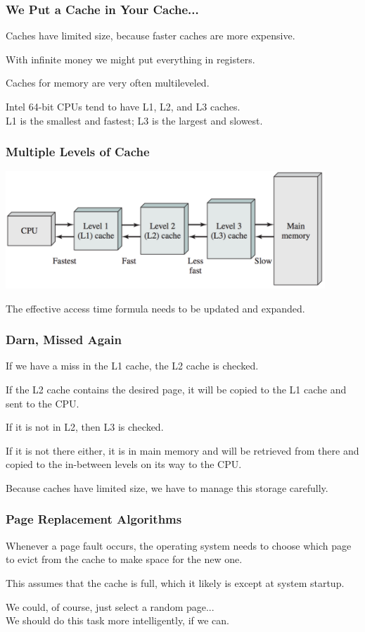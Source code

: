\begin{frame}
\frametitle{We Put a Cache in Your Cache...}

Caches have limited size, because faster caches are more expensive. 

With infinite money we might put everything in registers.

Caches for memory are very often multileveled. 

Intel 64-bit CPUs tend to have L1, L2, and L3 caches.\\
\quad L1 is the smallest and fastest;  L3 is the largest and slowest.

\end{frame}

\begin{frame}
\frametitle{Multiple Levels of Cache}

\begin{center}
\includegraphics[width=0.9\textwidth]{images/caches.png}
\end{center}

The effective access time formula needs to be updated and expanded.

\end{frame}

\begin{frame}
\frametitle{Darn, Missed Again}

If we have a miss in the L1 cache, the L2 cache is checked. 

If the L2 cache contains the desired page, it will be copied to the L1 cache and sent to the CPU. 

If it is not in L2, then L3 is checked. 

If it is not there either, it is in main memory and will be retrieved from there and copied to the in-between levels on its way to the CPU. 

Because caches have limited size, we have to manage this storage carefully.


\end{frame}

\begin{frame}
\frametitle{Page Replacement Algorithms}

Whenever a page fault occurs, the operating system needs to choose which page to \alert{evict} from the cache to make space for the new one. 

This assumes that the cache is full, which it likely is except at system startup. 

We could, of course, just select a random page...\\
\quad We should do this task more intelligently, if we can.

\end{frame}


